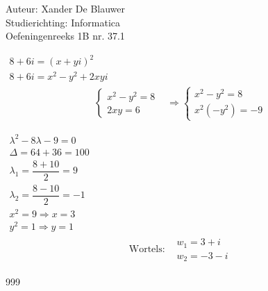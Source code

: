 \documentclass[a4paper]{article}
\begin{document}
\noindent \large Auteur: Xander De Blauwer \\
\noindent \large Studierichting: Informatica\\
\noindent \large Oefeningenreeks 1B nr. 37.1\\

\medskip

\normalsize


$\begin{array}{l}
8 + 6i = (x + yi)^2 \\
8 + 6i = x^2 - y^2 + 2xyi
\end{array}$\\

\[
\begin{array}{ll}
\left\{
\begin{array}{l}
x^2 - y^2 = 8 \\
2xy = 6
\end{array}
\right.
&
\Rightarrow
\left\{
\begin{array}{l}
x^2 - y^2 = 8 \\
x^2(-y^2) = -9
\end{array}
\right.
\end{array}
\]


$
\begin{array}{l}
\lambda^2 - 8\lambda - 9 = 0 \\
\Delta = 64 + 36 = 100
\end{array}
$\\


$
\begin{array} {l}
\lambda_1 = \dfrac{8+10}{2} = 9 \\
\lambda_2 = \dfrac{8-10}{2} = -1
\end{array}
$\\

$
\begin{array}{l}
x^2 = 9 \Rightarrow x = 3 \\
y^2 = 1 \Rightarrow y = 1
\end{array}
$\\

\[
\begin{array}{ll}
\text{Wortels:} &
\begin{array}{l}
w_1 = 3 + i \\
w_2 = -3 - i
\end{array}
\end{array}
\]





\begin{thebibliography}{999}
\end{thebibliography}
\end{document}
